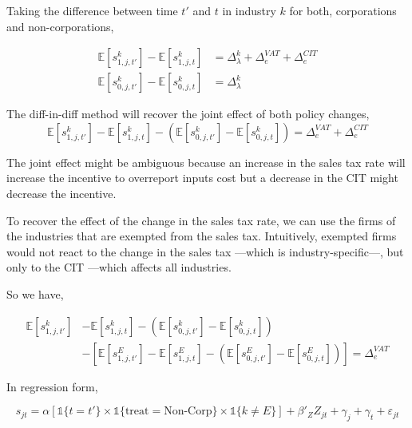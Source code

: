 \documentclass[
  12pt]{article}
\theoremstyle{definition}
\theoremstyle{remark}
\begin{document}
Taking the difference between time \(t'\) and \(t\) in industry \(k\)
for both, corporations and non-corporations,

\[
\begin{aligned}
    \mathbb{E}[s_{1,j,t'}^k]-\mathbb{E}[s_{1,j,t}^k]&=\Delta_\lambda^k+\Delta_e^{VAT}+\Delta_e^{CIT}\\
    \mathbb{E}[s_{0,j,t'}^k]-\mathbb{E}[s_{0,j,t}^k]&=\Delta_\lambda^k
\end{aligned}
\]

The diff-in-diff method will recover the joint effect of both policy
changes, \[
\mathbb{E}[s_{1,j,t'}^k]-\mathbb{E}[s_{1,j,t}^k]-\left(\mathbb{E}[s_{0,j,t'}^k]-\mathbb{E}[s_{0,j,t}^k]\right)=\Delta_e^{VAT}+\Delta_e^{CIT}
\]

The joint effect might be ambiguous because an increase in the sales tax
rate will increase the incentive to overreport inputs cost but a
decrease in the CIT might decrease the incentive.

To recover the effect of the change in the sales tax rate, we can use
the firms of the industries that are exempted from the sales tax.
Intuitively, exempted firms would not react to the change in the sales
tax ---which is industry-specific---, but only to the CIT ---which
affects all industries.

So we have,

\[
\begin{aligned}    
    \mathbb{E}[s_{1,j,t'}^k]&-\mathbb{E}[s_{1,j,t}^k]-\left(\mathbb{E}[s_{0,j,t'}^k]-\mathbb{E}[s_{0,j,t}^k]\right)\\ 
    &- \left[\mathbb{E}[s_{1,j,t'}^{E}]-\mathbb{E}[s_{1,j,t}^{E}]-\left(\mathbb{E}[s_{0,j,t'}^{E}]-\mathbb{E}[s_{0,j,t}^{E}]\right)\right]=\Delta_e^{VAT}
\end{aligned}
\]

In regression form,

\[
s_{jt}=\alpha \left[ \mathbb{1}\{t=t'\}\times\mathbb{1}\{\text{treat}=\text{Non-Corp}\}\times\mathbb{1}\{k\not=E\} \right]+\beta'_ZZ_{jt}+\gamma_j+\gamma_t+\varepsilon_{jt}
\]
\end{document}
